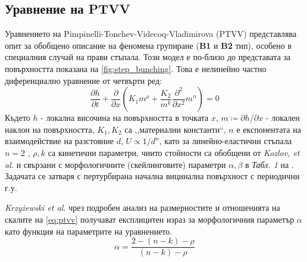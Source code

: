 \subsection{Уравнение на PTVV}
Уравнението на Pimpinelli-Tonchev-Videcoq-Vladimirova (PTVV) \cite{Pimpinelli2002} \cite{2Krug2005} представлява опит за обобщено описание на феномена групиране (\textbf{B1} и \textbf{B2} тип), особено в специалния случай на прави стъпала. Този модел е по-близо до представата за повърхността показана на \autoref{fig:step_bunching}. Това е нелинейно частно диференциално уравнение от четвърти ред:
\begin{equation}
    \frac{\partial h}{\partial t} + \frac{\partial }{\partial x} \left( K_{1} m^{\rho} + \frac{K_2}{m^k} \frac{\partial^2 }{\partial x^2} m ^ n \right) = 0
    \label{eq:ptvv}
\end{equation}
Където $h$ - локална височина на повърхността в точката $x$, $m \coloneqq \partial h / \partial x$ - локален наклон на повърхността, $K_1, K_2$ са ,,материални константи``, $n$ е експонентата на взаимодействие на разстояние $d$, $U \propto 1/d^n$, като за линейно-еластични стъпала $n = 2$ \cite{Kozlov2022}, $\rho, k$ са кинетични параметри, чиито стойности са обобщени от \textit{Kozlov, et al.} и свързани с морфологичните (скейлинговите) параметри $\alpha, \beta$ в \textit{Табл. 1} на \cite{Kozlov2022}. Задачата се затваря с пертурбирана начална вицинална повърхност с периодични г.у. 

\textit{Krzyżewski et al.} чрез подробен анализ на размерностите и отношенията на скалите на \autoref{eq:ptvv} \cite{Krzyewski2018} получават експлицитен израз за морфологичния параметър $\alpha$ като функция на параметрите на уравнението.
\begin{equation}
    \alpha = \frac{2 - (n-k) - \rho}{(n-k) - \rho}
    \label{eq:alpha_ptvv}
\end{equation}

